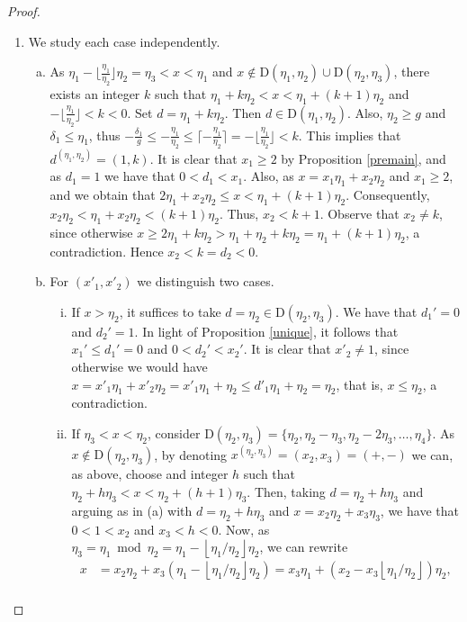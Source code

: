 \documentclass[11pt]{amsart}
\theoremstyle{remark}
\newcommand{\peb}[1]{\left\lfloor {#1}\right\rfloor}
\begin{document}
\begin{proof}
\begin{enumerate}[(1)]
\item We study each case independently.
\begin{enumerate}[(a)]
    \item As $\eta_1-\lfloor \frac{\eta_1}{\eta_2} \rfloor \eta_2= \eta_3 < x < \eta_1$ and $x\not\in \mathrm D(\eta_1,\eta_2)\cup\mathrm D(\eta_2,\eta_3)$, there exists an integer $k$ such that $\eta_1+k\eta_2<x<\eta_1+(k+1)\eta_2$ and $-\lfloor \frac{\eta_1}{\eta_2}\rfloor < k < 0$. Set $d=\eta_1+k\eta_2$. Then $d\in \mathrm D(\eta_1,\eta_2)$. Also, $\eta_2\ge g$ and $\delta_1\le \eta_1$, thus $-\frac{\delta_1}g\le -\frac{\eta_1}{\eta_2}\le \lceil -\frac{\eta_1}{\eta_2}\rceil= -\lfloor \frac{\eta_1}{\eta_2}\rfloor<k$. This implies that $d^{(\eta_1,\eta_2)}=(1,k)$. It is clear that $x_1\ge 2$ by Proposition \ref{premain}, and as  $d_1=1$ we have that $0<d_1<x_1$. Also, as  $x=x_1 \eta_1+x_2 \eta_2$ and $x_1\ge 2$, and we obtain that $2\eta_1+x_2 \eta_2\le x <\eta_1+(k+1)\eta_2$. Consequently, $x_2 \eta_2<\eta_1+x_2 \eta_2<(k+1)\eta_2$. Thus, $x_2<k+1$. Observe that $x_2\neq k$, since otherwise $x\ge 2\eta_1+k\eta_2> \eta_1+\eta_2+k\eta_2= \eta_1+(k+1)\eta_2$, a contradiction. Hence $x_2<k=d_2<0$.
    \item For $(x'_1,x'_2)$ we distinguish two cases.
     \begin{enumerate}[(i)]
      	\item If $x>\eta_2$, it suffices to take $d=\eta_2 \in \mathrm D(\eta_{2},\eta_{3})$. We have that $d_1'=0$ and $d_2'=1$. In light of Proposition \ref{unique}, it follows that $x_1'\le d_1'=0$ and $0<d_2'<x_2'$. It is clear that  $x'_2\neq 1$, since otherwise we would have  $x=x'_1\eta_1+x'_2\eta_2=x'_1\eta_1+\eta_2\le d'_1\eta_1+\eta_2=\eta_2$, that is, $x\le \eta_2$, a contradiction.
       	\item If $\eta_3<x<\eta_2$, consider $\mathrm D(\eta_2,\eta_3)=\{\eta_2,\eta_2-\eta_3,\eta_2-2\eta_3,\ldots ,\eta_4\}$. As $x\notin \mathrm D(\eta_2,\eta_3)$, by denoting   $x^{(\eta_2,\eta_3)}=(x_2,x_3)=(+,-)$ we can, as above, choose and integer $h$ such that $\eta_2+h\eta_3<x<\eta_2+(h+1)\eta_3$. Then, taking $d=\eta_2+h\eta_3$ and arguing as in (a) with $d=\eta_2+h\eta_3$ and $x=x_2\eta_2+x_3\eta_3$,  we have that  $0<1<x_2$ and $x_3<h<0$. Now, as  $\eta_3=\eta_1\bmod \eta_2=\eta_1-\peb{{\eta_1}/{\eta_2}}\eta_2$, we can rewrite
        	\begin{align*}
        	x & =  x_2\eta_2+x_3(\eta_1-\peb{{\eta_1}/{\eta_2}}\eta_2) = x_3\eta_1+(x_2-x_3\peb{{\eta_1}/{\eta_2}})\eta_2, \\

\end{align*}
\end{enumerate}
\end{enumerate}
\end{enumerate}
\end{proof}
\end{document}
